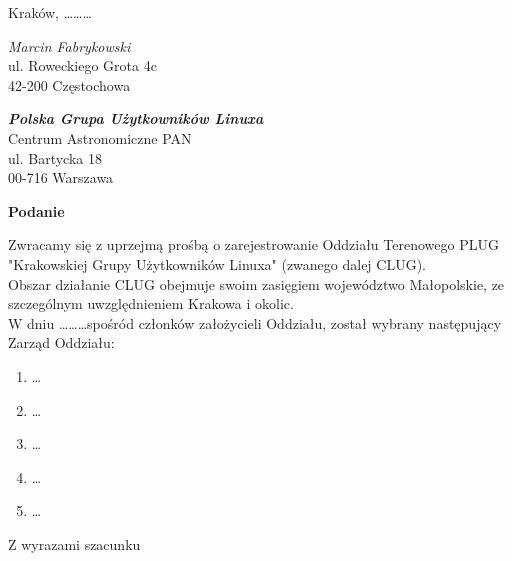 \documentclass[a4paper,12pt]{article}
\begin{document}
\thispagestyle{empty}
\flushright
Kraków, \ldots \ldots \ldots


\flushleft
\emph{Marcin Fabrykowski}\\
ul. Roweckiego Grota 4c\\
42-200 Częstochowa

\flushright
\textbf{\emph{Polska Grupa Użytkowników Linuxa}}\\
Centrum Astronomiczne PAN\\
ul. Bartycka 18\\
00-716 Warszawa\\


\begin{center}\Large{\textbf{Podanie}}\end{center}

\flushleft
Zwracamy się z uprzejmą prośbą o zarejestrowanie Oddziału Terenowego PLUG "Krakowskiej Grupy Użytkowników Linuxa" (zwanego dalej CLUG).\\
Obszar działanie CLUG obejmuje swoim zasięgiem województwo Małopolskie, ze szczególnym uwzględnieniem Krakowa i okolic.\\
W dniu \ldots \ldots\ldots spośród członków założycieli Oddziału, został wybrany następujący Zarząd Oddziału:
\begin{enumerate}
\item \ldots
\item \ldots 
\item \ldots
\item \ldots
\item \ldots
\end{enumerate}

\begin{flushright}
Z wyrazami szacunku
\end{flushright}



\end{document}
